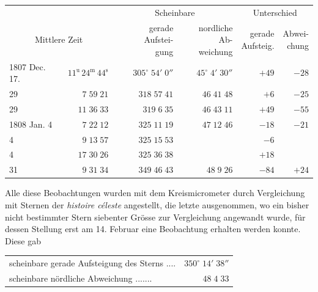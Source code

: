 \begin{center}\fontsize{9}{11}\selectfont\setlength{\tabcolsep}{2pt}\renewcommand{\arraystretch}{1.15}\begin{tabular}{lr|r|r||r|r}
& & \multicolumn{2}{c||}{Scheinbare} & \multicolumn{2}{c}{Unterschied}\\
\multicolumn{2}{c|}{Mittlere Zeit} & \shortstack{gerade Aufstei-\\gung} & \shortstack{nordliche Ab-\\weichung} & \shortstack{gerade\\Aufsteig.} & \shortstack{Abwei-\\chung}\\\hline
1807 Dec. 17. & $11^{\text{u}}\,24^{\text{m}}\,44^{\text{s}}$ & $305^\circ\;54'\;0''$ & $45^\circ\;4'\;30''$ & $+49$ & $-28$\\
29 & $7\;59\;21$ & $318\;57\;41$ & $46\;41\;48$ & $+6$ & $-25$\\
29 & $11\;36\;33$ & $319\;6\;35$ & $46\;43\;11$ & $+49$ & $-55$\\
1808 Jan. 4 & $7\;22\;12$ & $325\;11\;19$ & $47\;12\;46$ & $-18$ & $-21$\\
4 & $9\;13\;57$ & $325\;15\;53$ & & $-6$ & \\
4 & $17\;30\;26$ & $325\;36\;38$ & & $+18$ & \\
31 & $9\;31\;34$ & $349\;46\;43$ & $48\;9\;26$ & $-84$ & $+24$\\
\end{tabular}\end{center}

\par\indent Alle diese Beobachtungen wurden mit dem Kreismicrometer durch Vergleichung mit Sternen der
\emph{histoire céleste} angestellt, die letzte ausgenommen, wo ein bisher nicht bestimmter Stern
siebenter Grösse zur Vergleichung angewandt wurde, für dessen Stellung erst am 14. Februar eine
Beobachtung erhalten werden konnte. Diese gab


\begin{center}\fontsize{10}{12}\selectfont\setlength{\tabcolsep}{2pt}\renewcommand{\arraystretch}{1.15}\begin{tabular}{lr}
scheinbare gerade Aufsteigung des Sterns .\;.\;.\;.\; & $350^\circ\;14'\;38''$\\
scheinbare nördliche Abweichung .\;.\;.\;.\;.\;.\;.\; & $48\;4\;33$\\
\end{tabular}\end{center}

